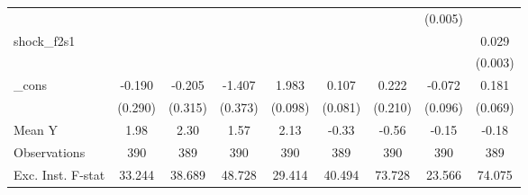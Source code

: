 {\begin{tabular}{l*{8}{c}}
            &                     &                     &                     &                     &                     &                     &     (0.005)         &                     \\
\addlinespace
shock\_f2s1  &                     &                     &                     &                     &                     &                     &                     &       0.029\sym{***}\\
            &                     &                     &                     &                     &                     &                     &                     &     (0.003)         \\
\addlinespace
\_cons      &      -0.190         &      -0.205         &      -1.407\sym{***}&       1.983\sym{***}&       0.107         &       0.222         &      -0.072         &       0.181\sym{**} \\
            &     (0.290)         &     (0.315)         &     (0.373)         &     (0.098)         &     (0.081)         &     (0.210)         &     (0.096)         &     (0.069)         \\
\midrule
Mean Y      &        1.98         &        2.30         &        1.57         &        2.13         &       -0.33         &       -0.56         &       -0.15         &       -0.18         \\
Observations&         390         &         389         &         390         &         390         &         389         &         390         &         390         &         389         \\
Exc. Inst. F-stat&      33.244         &      38.689         &      48.728         &      29.414         &      40.494         &      73.728         &      23.566         &      74.075         \\
\bottomrule
\end{tabular}
}
